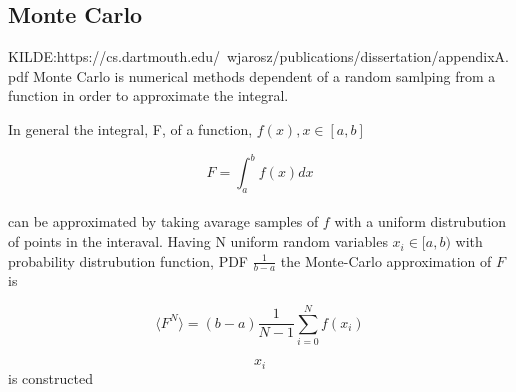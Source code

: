 \documentclass[../main.tex]{subfiles}
\begin{document}
\subsection{Monte Carlo}
\label{sec:MC}
KILDE:https://cs.dartmouth.edu/~wjarosz/publications/dissertation/appendixA.pdf
Monte Carlo is numerical methods dependent of a random samlping from a function in order to approximate the integral.


In general the integral, F, of a function, $f(x), x\in[a,b]$

\[F = \int_a^b f(x)dx\] \\

can be approximated by taking avarage samples of $f$ with a uniform distrubution of points in the interaval. Having N uniform random variables  $x_i \in [a,b)$ with probability distrubution function, PDF $\frac{1}{b-a}$ the Monte-Carlo approximation of $F$ is


\[\langle F^N \rangle = (b-a)\frac{1}{N-1} \sum_{i=0}^{N}  f(x_i)\]

\[x_i\] is constructed
\end{document}
